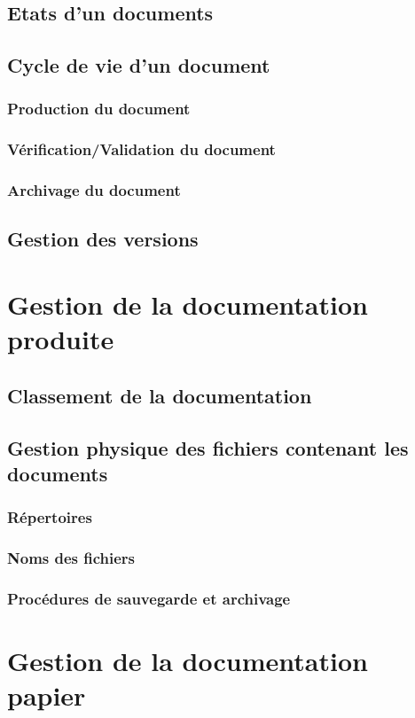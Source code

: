   \subsection{Etats d'un documents}
  
  \subsection{Cycle de vie d'un document}
    \subsubsection{Production du document}
    \subsubsection{Vérification/Validation du document}
    \subsubsection{Archivage du document}
  \subsection{Gestion des versions}
\section{Gestion de la documentation produite}
  \subsection{Classement de la documentation}
  \subsection{Gestion physique des fichiers contenant les documents}     
    \subsubsection{Répertoires}
    \subsubsection{Noms des fichiers}
    \subsubsection{Procédures de sauvegarde et archivage}
\section{Gestion de la documentation papier}
